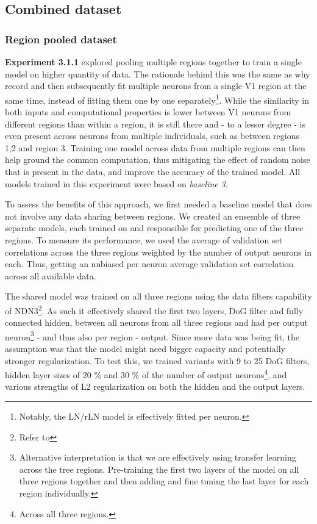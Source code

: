 \subsection{Combined dataset}\label{ch:5.3.1}
\subsubsection{Region pooled dataset}

\textbf{Experiment 3.1.1} explored pooling multiple regions together to train a single model on higher quantity of data. The rationale behind this was the same as why record and then subsequently fit multiple neurons from a single V1 region at the same time, instead of fitting them one by one separately\footnote{Notably, the LN/rLN model is effectively fitted per neuron.}. While the similarity in both inputs and computational properties is lower between V1 neurons from different regions than within a region, it is still there and - to a lesser degree - is even present across neurons from multiple individuals, such as between regions 1,2 and region 3. Training one model across data from multiple regions can then help ground the common computation, thus mitigating the effect of random noise that is present in the data, and improve the accuracy of the trained model. All models trained in this experiment were based on \textit{baseline 3}. 

To assess the benefits of this approach, we first needed a baseline model that does not involve any data sharing between regions. We created an ensemble of three separate models, each trained on and responsible for predicting one of the three regions. To measure its performance, we used the average of validation set correlations across the three regions weighted by the number of output neurons in each. Thus, getting an unbiased per neuron average validation set correlation across all available data.

The shared model was trained on all three regions using the data filters capability of NDN3\footnote{Refer to }. As such it effectively shared the first two layers, DoG filter and fully connected hidden, between all neurons from all three regions and had per output neuron\footnote{Alternative interpretation is that we are effectively using transfer learning across the tree regions. Pre-training the first two layers of the model on all three regions together and then adding and fine tuning the last layer for each region individually.} - and thus also per region - output. Since more data was being fit, the assumption was that the model might need bigger capacity and potentially stronger regularization. To test this, we trained variants with 9 to 25 DoG filters, hidden layer sizes of 20 \% and 30 \% of the number of output neurons\footnote{Across all three regions.}, and various strengths of L2 regularization on both the hidden and the output layers. 

